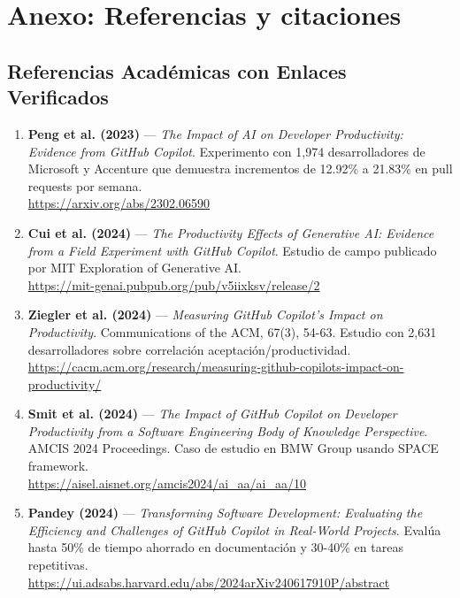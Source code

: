 \documentclass[12pt,a4paper,spanish]{article}
\begin{document}
\section*{Anexo: Referencias y citaciones}

\subsection{Referencias Académicas con Enlaces Verificados}

\begin{enumerate}

\item \textbf{Peng et al. (2023)} --- \textit{The Impact of AI on Developer Productivity: Evidence from GitHub Copilot}. Experimento con 1,974 desarrolladores de Microsoft y Accenture que demuestra incrementos de 12.92\% a 21.83\% en pull requests por semana.\\
\url{https://arxiv.org/abs/2302.06590}

\item \textbf{Cui et al. (2024)} --- \textit{The Productivity Effects of Generative AI: Evidence from a Field Experiment with GitHub Copilot}. Estudio de campo publicado por MIT Exploration of Generative AI.\\
\url{https://mit-genai.pubpub.org/pub/v5iixksv/release/2}

\item \textbf{Ziegler et al. (2024)} --- \textit{Measuring GitHub Copilot's Impact on Productivity}. Communications of the ACM, 67(3), 54-63. Estudio con 2,631 desarrolladores sobre correlación aceptación/productividad.\\
\url{https://cacm.acm.org/research/measuring-github-copilots-impact-on-productivity/}

\item \textbf{Smit et al. (2024)} --- \textit{The Impact of GitHub Copilot on Developer Productivity from a Software Engineering Body of Knowledge Perspective}. AMCIS 2024 Proceedings. Caso de estudio en BMW Group usando SPACE framework.\\
\url{https://aisel.aisnet.org/amcis2024/ai_aa/ai_aa/10}

\item \textbf{Pandey (2024)} --- \textit{Transforming Software Development: Evaluating the Efficiency and Challenges of GitHub Copilot in Real-World Projects}. Evalúa hasta 50\% de tiempo ahorrado en documentación y 30-40\% en tareas repetitivas.\\
\url{https://ui.adsabs.harvard.edu/abs/2024arXiv240617910P/abstract}


\end{enumerate}
\end{document}
